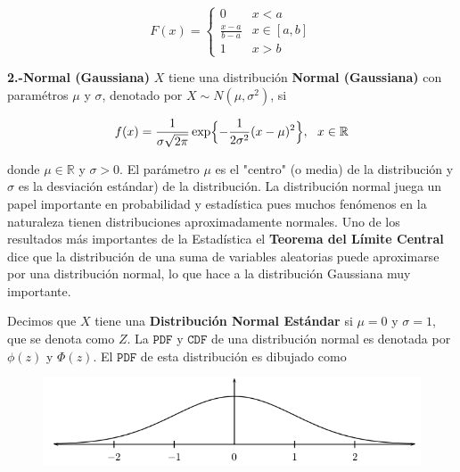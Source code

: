 \documentclass{article}\usepackage[]{graphicx}\usepackage[]{color}
\begin{document}
\[
F(x) = \begin{cases}
0 & x < a\\
\frac{x -a}{b -a} & x \in [a,b]\\
1 & x > b
\end{cases}
\]


\vspace{0.5cm}

\textbf{2.-Normal (Gaussiana)} $X$ tiene una distribuci\'on \textbf{Normal (Gaussiana)} con param\'etros $\mu$ y $\sigma$, denotado por $X \sim N(\mu, \sigma^2)$, si

\begin{align}
f(x) = \frac{1}{\sigma \sqrt{2\pi}}\exp\Bigl\{-\frac{1}{2\sigma^2}(x - \mu)^2 \Bigr\}, \ \ x \in \mathbb{R}
\end{align}

\vspace{0.3cm}

donde $\mu \in \mathbb{R}$ y $\sigma > 0$.  El par\'ametro $\mu$ es el "centro" (o media) de la distribuci\'on y $\sigma$ es la desviaci\'on est\'andar) de la distribuci\'on. La distribuci\'on normal juega un papel importante en probabilidad y estad\'istica pues muchos fen\'omenos en la naturaleza tienen distribuciones aproximadamente normales. Uno de los resultados m\'as importantes de la Estad\'istica el \textbf{Teorema del L\'imite Central} dice que la distribuci\'on de una suma de variables aleatorias puede aproximarse por una distribuci\'on normal, lo que hace a la distribuci\'on Gaussiana muy importante.

\vspace{0.3cm}

Decimos que $X$ tiene una \textbf{Distribuci\'on Normal Est\'andar} si $\mu = 0$ y $\sigma =1$, que se denota como $Z$. La $\texttt{PDF}$ y $\texttt{CDF}$ de una distribuci\'on normal es denotada por $\phi(z)$ y $\Phi(z)$. El $\texttt{PDF}$ de esta distribuci\'on es dibujado como


\vspace{0.2cm}
\begin{figure}[h]
\centering
\includegraphics[scale=.55]{graff1-nm.png}
\end{figure}
\end{document}
